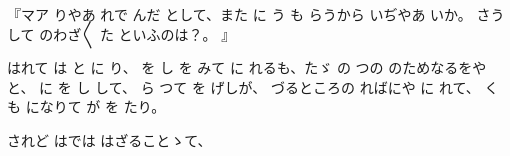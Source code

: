 『マア
りやあ
れで
んだ
として、また
に
う
も
らうから
いぢやあ
いか。
さうして
のわざ〳〵
た
といふのは？。
』

はれて
は
と
に
り、
を
し
を
みて
に
れるも、たゞ
の
つの
のためなるをやと、
に
を
し
して、
ら
つて
を
げしが、
づるところの
ればにや
に
れて、
くも
になりて
が
を
たり。

されど
はでは
はざることゝて、

